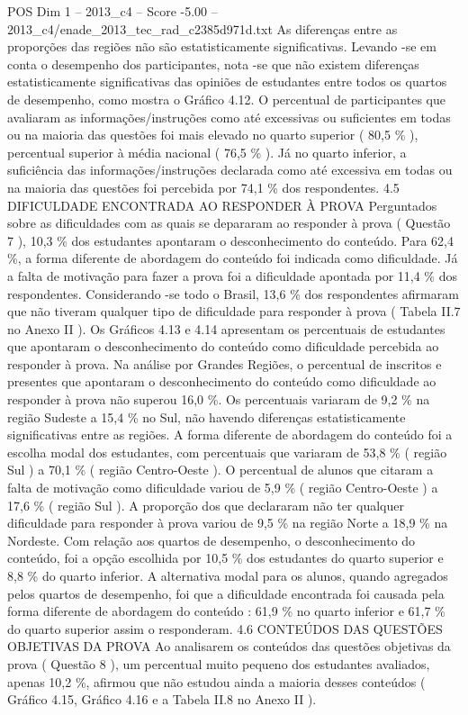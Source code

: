 \begin{textsample}{POS Dim 1 – 2013\_c4 – Score -5.00 – 2013\_c4/enade\_2013\_tec\_rad\_c2385d971d.txt}
As diferenças entre as proporções das regiões não são estatisticamente significativas.
Levando -se em conta o desempenho dos participantes, nota -se que não existem diferenças estatisticamente significativas das opiniões de estudantes entre todos os quartos de desempenho, como mostra o Gráfico 4.12.
O percentual de participantes que avaliaram as informações/instruções como até excessivas ou suficientes em todas ou na maioria das questões foi mais elevado no quarto superior ( 80,5 \% ), percentual superior à média nacional ( 76,5 \% ).
Já no quarto inferior, a suficiência das informações/instruções declarada como até excessiva em todas ou na maioria das questões foi percebida por 74,1 \% dos respondentes. 4.5 DIFICULDADE ENCONTRADA AO RESPONDER À PROVA Perguntados sobre as dificuldades com as quais se depararam ao responder à prova ( Questão 7 ), 10,3 \% dos estudantes apontaram o desconhecimento do conteúdo.
Para 62,4 \%, a forma diferente de abordagem do conteúdo foi indicada como dificuldade.
Já a falta de motivação para fazer a prova foi a dificuldade apontada por 11,4 \% dos respondentes.
Considerando -se todo o Brasil, 13,6 \% dos respondentes afirmaram que não tiveram qualquer tipo de dificuldade para responder à prova ( Tabela II.7 no Anexo II ).
Os Gráficos 4.13 e 4.14 apresentam os percentuais de estudantes que apontaram o desconhecimento do conteúdo como dificuldade percebida ao responder à prova.
Na análise por Grandes Regiões, o percentual de inscritos e presentes que apontaram o desconhecimento do conteúdo como dificuldade ao responder à prova não superou 16,0 \%.
Os percentuais variaram de 9,2 \% na região Sudeste a 15,4 \% no Sul, não havendo diferenças estatisticamente significativas entre as regiões.
A forma diferente de abordagem do conteúdo foi a escolha modal dos estudantes, com percentuais que variaram de 53,8 \% ( região Sul ) a 70,1 \% ( região Centro-Oeste ).
O percentual de alunos que citaram a falta de motivação como dificuldade variou de 5,9 \% ( região Centro-Oeste ) a 17,6 \% ( região Sul ).
A proporção dos que declararam não ter qualquer dificuldade para responder à prova variou de 9,5 \% na região Norte a 18,9 \% na Nordeste.
Com relação aos quartos de desempenho, o desconhecimento do conteúdo, foi a opção escolhida por 10,5 \% dos estudantes do quarto superior e 8,8 \% do quarto inferior.
A alternativa modal para os alunos, quando agregados pelos quartos de desempenho, foi que a dificuldade encontrada foi causada pela forma diferente de abordagem do conteúdo : 61,9 \% no quarto inferior e 61,7 \% do quarto superior assim o responderam. 4.6 CONTEÚDOS DAS QUESTÕES OBJETIVAS DA PROVA Ao analisarem os conteúdos das questões objetivas da prova ( Questão 8 ), um percentual muito pequeno dos estudantes avaliados, apenas 10,2 \%, afirmou que não estudou ainda a maioria desses conteúdos ( Gráfico 4.15, Gráfico 4.16 e a Tabela II.8 no Anexo II ).

\end{textsample}
